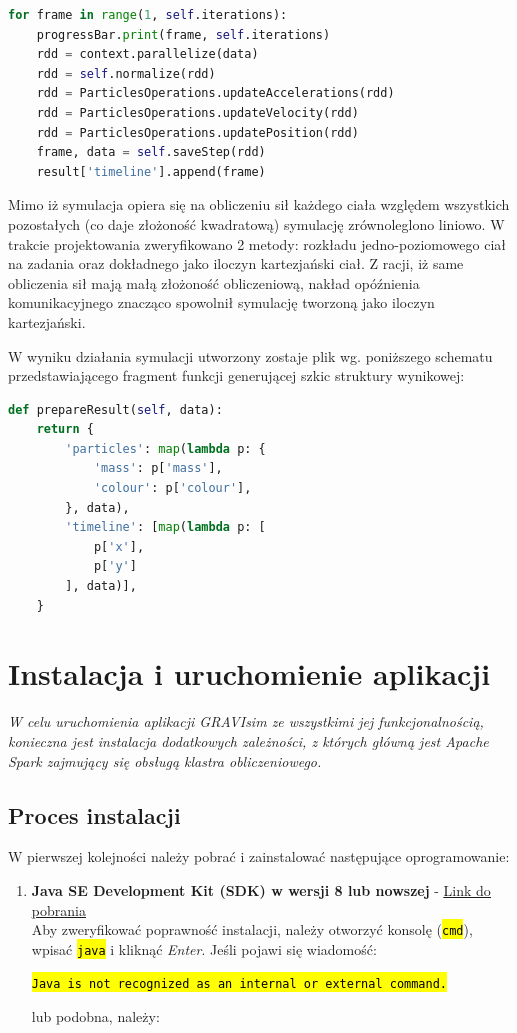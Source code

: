 \documentclass[a4paper,onecolumn,oneside,12pt]{memoir}
\begin{document}
{\begin{lstlisting}[language=Python, caption=Plik wejściowy symulacji]
for frame in range(1, self.iterations):
	progressBar.print(frame, self.iterations)
	rdd = context.parallelize(data)
	rdd = self.normalize(rdd)
	rdd = ParticlesOperations.updateAccelerations(rdd)
	rdd = ParticlesOperations.updateVelocity(rdd)
	rdd = ParticlesOperations.updatePosition(rdd)
	frame, data = self.saveStep(rdd)
	result['timeline'].append(frame)
\end{lstlisting}

Mimo iż symulacja opiera się na obliczeniu sił każdego ciała względem wszystkich pozostałych
(co daje złożoność kwadratową) symulację zrównoleglono liniowo. W trakcie projektowania
zweryfikowano 2 metody: rozkładu jedno-poziomowego ciał na zadania oraz dokładnego jako
iloczyn kartezjański ciał. Z racji, iż same obliczenia sił mają małą złożoność obliczeniową,
nakład opóźnienia komunikacyjnego znacząco spowolnił symulację tworzoną jako iloczyn kartezjański.

W wyniku działania symulacji utworzony zostaje plik wg. poniższego schematu przedstawiającego
fragment funkcji generującej szkic struktury wynikowej:

\begin{lstlisting}[language=Python, caption=Wynik symulacji]
def prepareResult(self, data):
	return {
		'particles': map(lambda p: {
			'mass': p['mass'],
			'colour': p['colour'],
		}, data),
		'timeline': [map(lambda p: [
			p['x'],
			p['y']
		], data)],
	}
\end{lstlisting}


\chapter{Instalacja i uruchomienie aplikacji}
{\emph{\quad \quad W celu uruchomienia aplikacji GRAVIsim ze wszystkimi jej funkcjonalnością, konieczna jest instalacja dodatkowych zależności, z których główną jest \textit{Apache Spark} zajmujący się obsługą klastra obliczeniowego.}
\section{Proces instalacji}
W pierwszej kolejności należy pobrać i zainstalować następujące oprogramowanie:


\begin{enumerate}

\item {
\textbf{Java SE Development Kit (SDK) w wersji 8 lub nowszej} - \underline{\href{http://www.oracle.com/technetwork/java/javase/downloads/jdk8-downloads-2133151.html}{Link do pobrania}}  \\
Aby zweryfikować poprawność instalacji, należy otworzyć konsolę (\texttt{\hl{cmd}}), wpisać \texttt{\hl{java}} i kliknąć \textit{Enter}. Jeśli pojawi się wiadomość: \\
 \centerline{\texttt{\hl{Java is not recognized as an internal or external command.}}}
lub podobna, należy:

}
\end{enumerate}}}
\end{document}
